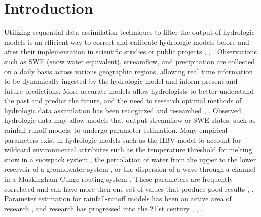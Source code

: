 \chapter{Introduction}



	Utilizing sequential data assimilation techniques to filter the output of hydrologic models is an efficient way to correct and calibrate hydrologic models before and after their implementation in scientific studies or public projects \cite{Reichle2002}, \cite{Moradkhani2005}, \cite{Reichle2008}. Observations such as SWE (snow water equivalent), streamflow, and precipitation are collected on a daily basis across various geographic regions, allowing  real time information to be dynamically ingested by the hydrologic model and inform present and future predictions. More accurate models allow hydrologists to better understand the past and predict the future, and the need to research optimal methods of hydrologic data assimilation has been recognized \cite{Troch2003} and researched \cite{Liu2007}, \cite{Reichle2008}. Observed hydrologic data may allow models that output streamflow or SWE states, such as rainfall-runoff models, to undergo parameter estimation. Many empirical parameters exist in hydrologic models such as the HBV model to account for wildcard environmental attributes such as the temperature threshold for melting snow in a snowpack system \cite{Maneta2008}, the percolation of water from the upper to the lower reservoir of a groundwater system \cite{Maneta2008}, or the dispersion of a wave through a channel in a Muskingham-Cunge routing system \cite{Montero2016}. These parameters are frequently correlated and can have more then one set of values that produce good results \cite{Jakeman1993}, \cite{Maneta2008}. Parameter estimation for rainfall-runoff models has been an active area of research \cite{Sorooshian1980},\cite{Sorooshian1993} and research has progressed into the 21'st century \cite{Moradkhani2005}, \cite{Wagener2006}, \cite{Reichle2008}.
	
